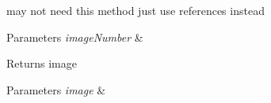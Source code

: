 
\begin{DoxyRefList}
\item[\label{todo__todo000001}%
\hypertarget{todo__todo000001}{}%
Member \hyperlink{classVelocityData_a73a11db5baa02a5f450f6a8ae8ffbc57}{Velocity\+Data\+:\+:get\+Image\+\_\+1} ()]may not need this method just use references instead 
\begin{DoxyParams}{Parameters}
{\em image\+Number} & \\
\hline
\end{DoxyParams}
\begin{DoxyReturn}{Returns}
image 
\end{DoxyReturn}

\begin{DoxyParams}{Parameters}
{\em image} & \\
\hline
\end{DoxyParams}

\end{DoxyRefList}